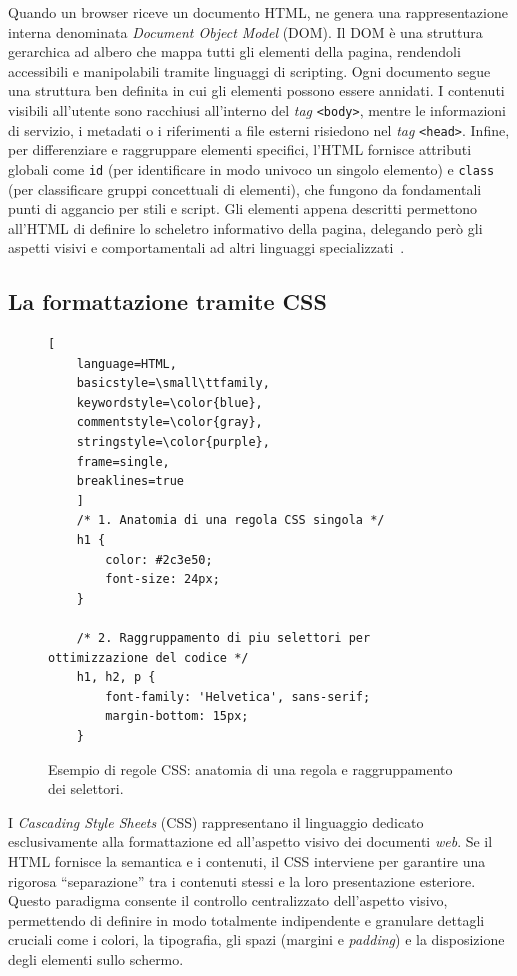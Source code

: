 Quando un browser riceve un documento HTML, ne genera una rappresentazione interna denominata \textit{Document Object Model} (DOM). Il DOM è una struttura gerarchica ad albero che mappa tutti gli elementi della pagina, rendendoli accessibili e manipolabili tramite linguaggi di scripting. Ogni documento segue una struttura ben definita in cui gli elementi possono essere annidati. I contenuti visibili all'utente sono racchiusi all'interno del \textit{tag} \texttt{<body>}, mentre le informazioni di servizio, i metadati o i riferimenti a file esterni risiedono nel \textit{tag} \texttt{<head>}. Infine, per differenziare e raggruppare elementi specifici, l'HTML fornisce attributi globali come \texttt{id} (per identificare in modo univoco un singolo elemento) e \texttt{class} (per classificare gruppi concettuali di elementi), che fungono da fondamentali punti di aggancio per stili e script. Gli elementi appena descritti permettono all'HTML di definire lo scheletro informativo della pagina, delegando però gli aspetti visivi e comportamentali ad altri linguaggi specializzati~\autocite[cap.~5]{niederstrobbinsLearningWebDesign2025}.



\subsection{La formattazione tramite CSS} 
\begin{figure}[t]
\centering
\begin{lstlisting}[
	language=HTML,
	basicstyle=\small\ttfamily,
	keywordstyle=\color{blue},
	commentstyle=\color{gray},
	stringstyle=\color{purple},
	frame=single,
	breaklines=true
	]
	/* 1. Anatomia di una regola CSS singola */
	h1 {
		color: #2c3e50;
		font-size: 24px;
	}
	
	/* 2. Raggruppamento di piu selettori per ottimizzazione del codice */
	h1, h2, p {
		font-family: 'Helvetica', sans-serif;
		margin-bottom: 15px;
	}
\end{lstlisting}
\caption{Esempio di regole CSS: anatomia di una regola e raggruppamento dei selettori.}
\label{fig:css_regole}
\end{figure}
I \textit{Cascading Style Sheets} (CSS) rappresentano il linguaggio dedicato esclusivamente alla formattazione ed all'aspetto visivo dei documenti \textit{web}. Se il HTML fornisce la semantica e i contenuti, il CSS interviene per garantire una rigorosa ``separazione'' tra i contenuti stessi e la loro presentazione esteriore. Questo paradigma consente il controllo centralizzato dell'aspetto visivo, permettendo di definire in modo totalmente indipendente e granulare dettagli cruciali come i colori, la tipografia, gli spazi (margini e \textit{padding}) e la disposizione degli elementi sullo schermo.

